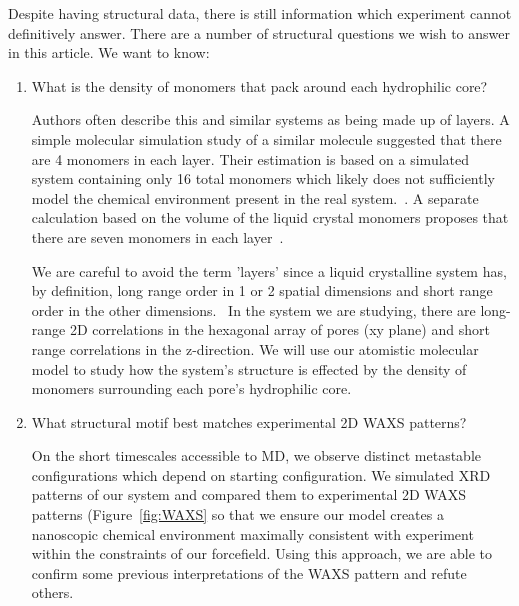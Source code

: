 \documentclass[journal=jpcbfk,manusciprt=article]{achemso}
\begin{document}
  Despite having structural data, there is still information which experiment cannot
  definitively answer. There are a number of structural questions we wish to answer in this 
  article. We want to know:
  \begin{enumerate}
    \item What is the density of monomers that pack around each hydrophilic core? 
    \label{point:monomernum}

 	Authors often describe this and similar systems as being made up of layers. A simple
 	molecular simulation study of a similar molecule suggested that there are 4 monomers
 	in each layer. Their estimation is based on a simulated system containing only 16 total
 	monomers which likely does not sufficiently model the chemical environment present in
 	the real system.~\cite{zhu_methacrylated_2006}. A separate calculation based on the 
 	volume of the liquid crystal monomers proposes that there are seven monomers in each 
 	layer~\cite{resel_structural_2000}. 

 	We are careful to avoid the term 'layers' since a liquid crystalline system has, by 
 	definition, long range order in 1 or 2 spatial dimensions and short range order in 	
 	the other dimensions.~\cite{chaikin_principles_1995}  %
 	In the system we are studying, there are long-range 2D correlations in the 
 	hexagonal array of pores (xy plane) and short range correlations in the z-direction.
 	We will use our atomistic molecular model to study how the system's structure is 
 	effected by the density of monomers surrounding each pore's hydrophilic core. 

	\item What structural motif best matches experimental 2D WAXS patterns?\label{point:xrdmatch}

	On the short timescales accessible to MD, we observe distinct metastable configurations
	which depend on starting configuration. We simulated XRD patterns of our system and 
	compared them to experimental 2D WAXS patterns (Figure~\ref{fig:WAXS} so that we ensure our
	model creates a nanoscopic chemical environment maximally consistent with experiment within 
	the constraints	of our forcefield. Using this approach, we are able to confirm some previous
	interpretations	of the WAXS pattern and refute others. 
	


\end{enumerate}
\end{document}
